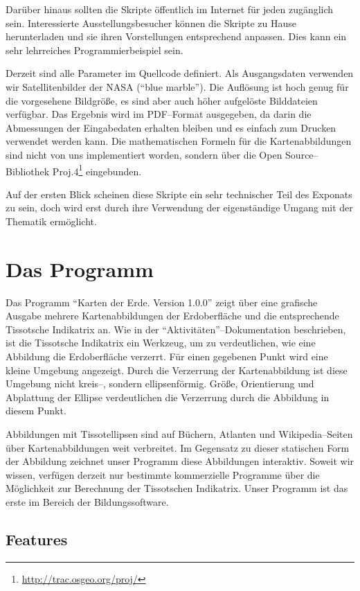 \documentclass[a4paper,12pt]{article}
\begin{document}
Darüber hinaus sollten die Skripte öffentlich im Internet für jeden zugänglich sein.
Interessierte Ausstellungsbesucher können die Skripte zu Hause herunterladen und 
sie ihren Vorstellungen entsprechend anpassen. Dies kann ein sehr lehrreiches 
Programmierbeispiel sein.

Derzeit sind alle Parameter im Quellcode definiert. Als Ausgangsdaten verwenden wir 
Satellitenbilder der NASA ("`blue marble"'). Die Auflösung ist hoch genug für die 
vorgesehene Bildgröße, es sind aber auch höher aufgelöste Bilddateien verfügbar.
Das Ergebnis wird im PDF--Format ausgegeben, da darin die Abmessungen der Eingabedaten
erhalten bleiben und es einfach zum Drucken verwendet werden kann. Die mathematischen 
Formeln für die Kartenabbildungen sind nicht von uns implementiert worden, sondern über 
die Open Source--Bibliothek Proj.4\footnote{\url{http://trac.osgeo.org/proj/}}
eingebunden.

Auf der ersten Blick scheinen diese Skripte ein sehr technischer Teil des Exponats
zu sein, doch wird erst durch ihre Verwendung der eigenständige Umgang mit der 
Thematik ermöglicht.


\section{Das Programm}

Das Programm "`Karten der Erde. Version 1.0.0"' zeigt über eine grafische Ausgabe 
mehrere Kartenabbildungen der Erdoberfläche und die entsprechende Tissotsche Indikatrix
an. Wie in der "`Aktivitäten"'--Dokumentation beschrieben, ist die Tissotsche
Indikatrix ein Werkzeug, um zu verdeutlichen, wie eine Abbildung die Erdoberfläche 
verzerrt.
Für einen gegebenen Punkt wird eine kleine Umgebung angezeigt. Durch die Verzerrung 
der Kartenabbildung ist diese Umgebung nicht kreis--, sondern ellipsenförmig. Größe, 
Orientierung und Abplattung der Ellipse verdeutlichen die Verzerrung durch die 
Abbildung in diesem Punkt.

Abbildungen mit Tissotellipsen sind auf Büchern, Atlanten und Wikipedia--Seiten 
über Kartenabbildungen weit verbreitet. Im Gegensatz zu dieser statischen Form der 
Abbildung zeichnet unser Programm diese Abbildungen interaktiv. Soweit wir wissen, 
verfügen derzeit nur bestimmte kommerzielle Programme über die Möglichkeit zur 
Berechnung der Tissotschen Indikatrix. Unser Programm ist das erste im Bereich der 
Bildungssoftware.

\subsection{Features}
\end{document}
